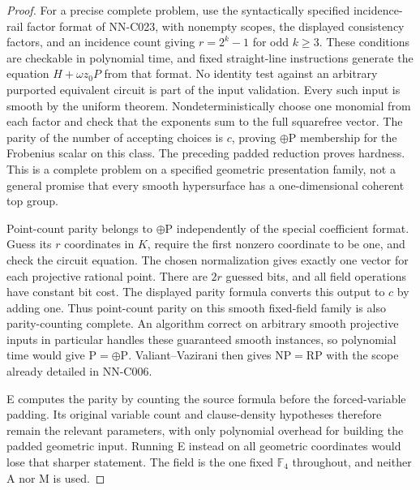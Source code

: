 \begin{proof}
For a precise complete problem, use the syntactically specified incidence-rail factor format of NN-C023, with nonempty scopes, the displayed consistency factors, and an incidence count giving $r=2^k-1$ for odd $k\geq3$. These conditions are checkable in polynomial time, and fixed straight-line instructions generate the equation $H+\omega z_0P$ from that format. No identity test against an arbitrary purported equivalent circuit is part of the input validation. Every such input is smooth by the uniform theorem. Nondeterministically choose one monomial from each factor and check that the exponents sum to the full squarefree vector. The parity of the number of accepting choices is $c$, proving $\oplus\mathrm P$ membership for the Frobenius scalar on this class. The preceding padded reduction proves hardness. This is a complete problem on a specified geometric presentation family, not a general promise that every smooth hypersurface has a one-dimensional coherent top group.

Point-count parity belongs to $\oplus\mathrm P$ independently of the special coefficient format. Guess its $r$ coordinates in $K$, require the first nonzero coordinate to be one, and check the circuit equation. The chosen normalization gives exactly one vector for each projective rational point. There are $2r$ guessed bits, and all field operations have constant bit cost. The displayed parity formula converts this output to $c$ by adding one. Thus point-count parity on this smooth fixed-field family is also parity-counting complete. An algorithm correct on arbitrary smooth projective inputs in particular handles these guaranteed smooth instances, so polynomial time would give $\mathrm P=\oplus\mathrm P$. Valiant--Vazirani then gives $\mathrm{NP}=\mathrm{RP}$ with the scope already detailed in NN-C006.

E computes the parity by counting the source formula before the forced-variable padding. Its original variable count and clause-density hypotheses therefore remain the relevant parameters, with only polynomial overhead for building the padded geometric input. Running E instead on all geometric coordinates would lose that sharper statement. The field is the one fixed $\mathbb F_4$ throughout, and neither A nor M is used.
\end{proof}
